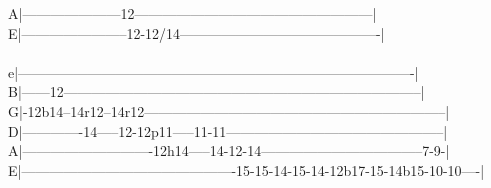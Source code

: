 {A|---------------------12---------------------------------------------------|\\
E|-----------------------12-12/14-------------------------------------------|\\
\\
e|-------------------------------------------------------------------------------------|\\
B|------12-----------------------------------------------------------------------------|\\
G|-12b14--14r12--14r12-----------------------------------------------------------------|\\
D|-------------14-----12-12p11-----11-11-----------------------------------------------|\\
A|----------------------------12h14-----14-12-14-----------------------------------7-9-|\\
E|----------------------------------------------15-15-14-15-14-12b17-15-14b15-10-10----|}
